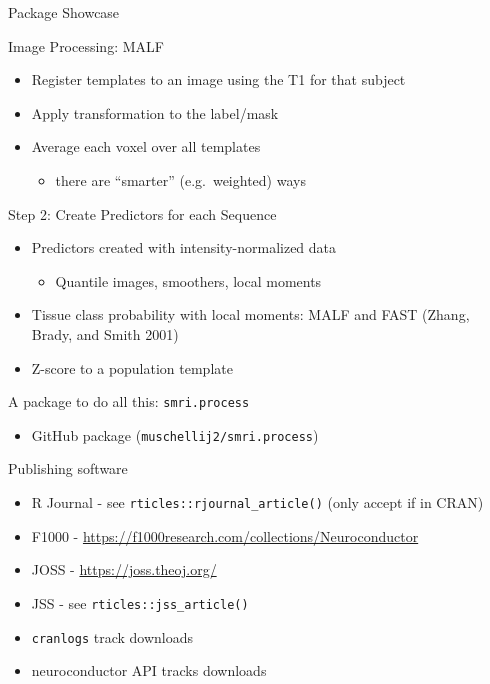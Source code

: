 \documentclass[ignorenonframetext,]{beamer}
\providecommand{\tightlist}{%
  \setlength{\itemsep}{0pt}\setlength{\parskip}{0pt}}
\begin{document}
\begin{frame}[fragile]{Package Showcase}
\begin{block}{Image Processing: MALF}
\hypertarget{right_col}{}
\begin{itemize}
\tightlist
\item
  Register templates to an image using the T1 for that subject
\item
  Apply transformation to the label/mask
\item
  Average each voxel over all templates

  \begin{itemize}
  \tightlist
  \item
    there are “smarter” (e.g.~weighted) ways
  \end{itemize}
\end{itemize}

\end{block}

\begin{block}{Step 2: Create Predictors for each Sequence}

\leavevmode\hypertarget{left_col}{}%

\hypertarget{right_col}{}
\begin{itemize}
\tightlist
\item
  Predictors created with intensity-normalized data

  \begin{itemize}
  \tightlist
  \item
    Quantile images, smoothers, local moments
  \end{itemize}
\item
  Tissue class probability with local moments: MALF and FAST (Zhang,
  Brady, and Smith 2001)
\item
  Z-score to a population template
\end{itemize}

\end{block}

\begin{block}{A package to do all this: \texttt{smri.process}}

\begin{itemize}
\tightlist
\item
  GitHub package (\texttt{muschellij2/smri.process})
\end{itemize}

\end{block}

\begin{block}{Publishing software}

\begin{itemize}
\tightlist
\item
  R Journal - see \texttt{rticles::rjournal\_article()} (only accept if
  in CRAN)
\item
  F1000 - \url{https://f1000research.com/collections/Neuroconductor}
\item
  JOSS - \url{https://joss.theoj.org/}
\item
  JSS - see \texttt{rticles::jss\_article()}
\item
  \texttt{cranlogs} track downloads
\item
  neuroconductor API tracks downloads
\end{itemize}


\end{block}
\end{frame}
\end{document}
